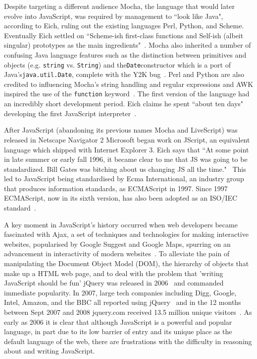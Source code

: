 \documentclass[]{final_report}
\begin{document}
Despite targeting a different audience Mocha, the language that would later evolve into JavaScript, was required by management to ``look like Java", according to Eich, ruling out the existing languages Perl, Python, and Scheme. Eventually Eich settled on ``Scheme-ish first-class functions and Self-ish (albeit singular) prototypes as the main ingredients"~\cite{popularityofjavascript}. Mocha also inherited a number of confusing Java language features such as the distinction between primitives and objects (e.g. \lstinline{string} vs. \lstinline{String}) and the\lstinline{Date}constructor which is a port of Java's\lstinline{java.util.Date}, complete with the Y2K bug~\cite{brendaneichtimetomakejscomment}. Perl and Python are also credited to influencing Mocha's string handling and regular expressions and AWK inspired the use of the \lstinline{function} keyword~\cite{briefhistoryofjavascript}. The first version of the language had an incredibly short development period. Eich claims he spent ``about ten days" developing the first JavaScript interpreter~\cite{AZProgrammingLanguages}.

After JavaScript (abandoning its previous names Mocha and LiveScript) was released in Netscape Navigator 2 Microsoft began work on JScript, an equivalent language which shipped with Internet Explorer 3. Eich says that ``At some point in late summer or early fall 1996, it became clear to me that JS was going to be standardized. Bill Gates was bitching about us changing JS all the time."~\cite{newjavascriptmoduleowner} This led to JavaScript being standardised by Ecma International, an industry group that produces information standards, as ECMAScript in 1997. Since 1997 ECMAScript, now in its sixth version, has also been adopted as an ISO/IEC standard~\cite{ISO/IEC16262:2011}.

A key moment in JavaScript's history occurred when web developers became fascinated with Ajax, a set of techniques and technologies for making interactive websites, popularised by Google Suggest and Google Maps, spurring on an advancement in interactivity of modern websites~\cite{ajax}. To alleviate the pain of manipulating the Document Object Model (DOM), the hierarchy of objects that make up a HTML web page, and to deal with the problem that 'writing JavaScript should be fun' jQuery was released in 2006~\cite{historyofjquery} and commanded immediate popularity. In 2007, large tech companies including Digg, Google, Intel, Amazon, and the BBC all reported using jQuery~\cite{historyofjquery} and in the 12 months between Sept 2007 and 2008 jquery.com received 13.5 million unique visitors~\cite{stateofjquery}. As early as 2006 it is clear that although JavaScript is a powerful and popular language, in part due to its low barrier of entry and its unique place as the default language of the web, there are frustrations with the difficulty in reasoning about and writing JavaScript.
\end{document}
